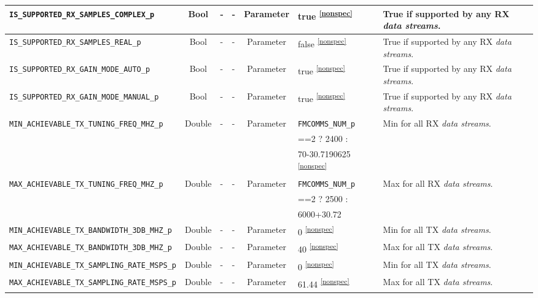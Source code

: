 \documentclass{article}
\begin{document}
\begin{landscape}
\begin{scriptsize}
\begin{longtable}{|p{5.16cm}|c|p{3.5cm}|p{3.4cm}|c|p{2.1cm}|p{3.75cm}|}
			\hline
			\verb+IS_SUPPORTED_RX_SAMPLES_COMPLEX_p+           & Bool   & -        & - & Parameter           & true \textsuperscript{\ref{nonspec}}  & True if supported by any RX \textit{data streams}. \\
			\hline
			\verb+IS_SUPPORTED_RX_SAMPLES_REAL_p+              & Bool   & -        & - & Parameter           & false \textsuperscript{\ref{nonspec}}  & True if supported by any RX \textit{data streams}. \\
			\hline
			\verb+IS_SUPPORTED_RX_GAIN_MODE_AUTO_p+            & Bool   & -        & - & Parameter           & true \textsuperscript{\ref{nonspec}} & True if supported by any RX \textit{data streams}. \\
			\hline
			\verb+IS_SUPPORTED_RX_GAIN_MODE_MANUAL_p+          & Bool   & -        & - & Parameter           & true \textsuperscript{\ref{nonspec}} & True if supported by any RX \textit{data streams}. \\
			\hline
			\verb+MIN_ACHIEVABLE_TX_TUNING_FREQ_MHZ_p+        & Double & -        & - & Parameter          & \verb+FMCOMMS_NUM_p+& Min for all RX \textit{data streams}. \\
			 & & & & & ==2 ? 2400 : & \\
			 & & & & & 70-30.7190625 \textsuperscript{\ref{nonspec}} & \\
			\hline
			\verb+MAX_ACHIEVABLE_TX_TUNING_FREQ_MHZ_p+       & Double & -        & - & Parameter           & \verb+FMCOMMS_NUM_p+ & Max for all RX \textit{data streams}. \\
			 & & & & & ==2 ? 2500 : & \\
			 & & & & & 6000+30.72 & \\
			\hline
			\verb+MIN_ACHIEVABLE_TX_BANDWIDTH_3DB_MHZ_p+      & Double & -        & - & Parameter           & 0 \textsuperscript{\ref{nonspec}} & Min for all TX \textit{data streams}. \\
			\hline
			\verb+MAX_ACHIEVABLE_TX_BANDWIDTH_3DB_MHZ_p+      & Double & -        & - & Parameter           & 40 \textsuperscript{\ref{nonspec}} & Max for all TX \textit{data streams}. \\
			\hline
			\verb+MIN_ACHIEVABLE_TX_SAMPLING_RATE_MSPS_p+      & Double & -        & - & Parameter           & 0 \textsuperscript{\ref{nonspec}} & Min for all TX \textit{data streams}. \\
			\hline
			\verb+MAX_ACHIEVABLE_TX_SAMPLING_RATE_MSPS_p+      & Double & -        & - & Parameter           & 61.44 \textsuperscript{\ref{nonspec}} & Max for all TX \textit{data streams}. \\

\end{longtable}
\end{scriptsize}
\end{landscape}
\end{document}

